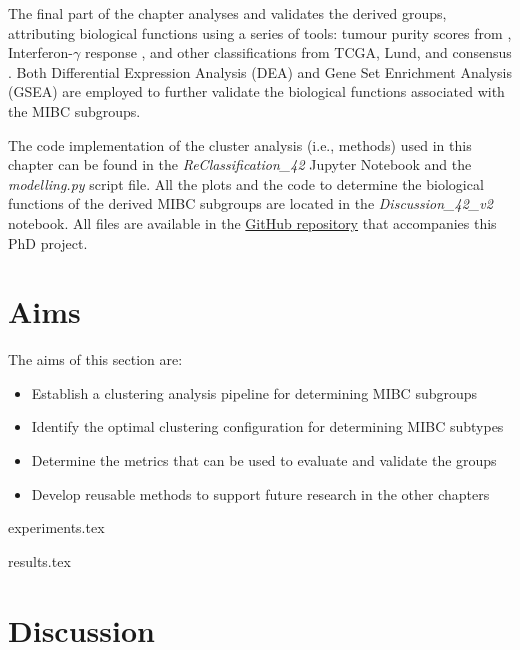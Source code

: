 The final part of the chapter analyses and validates the derived groups, attributing biological functions using a series of tools: tumour purity scores from \citet{Yoshihara2013-wq}, Interferon-$\gamma$ response \citet{Baker2022-bj}, and other classifications from TCGA, Lund, and consensus \citep{Robertson2017-mg,Marzouka2018-ge,Kamoun2020-tj}. Both Differential Expression Analysis (DEA) and Gene Set Enrichment Analysis (GSEA) are employed to further validate the biological functions associated with the MIBC subgroups.

The code implementation of the cluster analysis (i.e., methods) used in this chapter can be found in the \textit{ReClassification\_42} Jupyter Notebook and the \textit{modelling.py} script file. All the plots and the code to determine the biological functions of the derived MIBC subgroups are located in the \textit{Discussion\_42\_v2} notebook. All files are available in the \href{https://github.com/vladUng/Phd_thesis_exp}{GitHub repository} that accompanies this PhD project.


\section{Aims}

The aims of this section are:
\begin{itemize}
    \item Establish a clustering analysis pipeline for determining MIBC subgroups
    \item Identify the optimal clustering configuration for determining MIBC subtypes
    \item Determine the metrics that can be used to evaluate and validate the groups
    \item Develop reusable methods to support future research in the other chapters
\end{itemize}




{experiments.tex}

{results.tex}

\section{Discussion}

